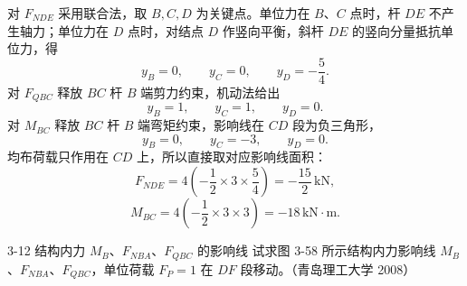 \begin{solutioncard}

对 \(F_{NDE}\) 采用联合法，取 \(B,C,D\) 为关键点。单位力在 \(B\)、\(C\) 点时，杆 \(DE\) 不产生轴力；单位力在 \(D\) 点时，对结点 \(D\) 作竖向平衡，斜杆 \(DE\) 的竖向分量抵抗单位力，得
\[
  y_B=0,\qquad y_C=0,\qquad y_D=-\frac54.
\]
对 \(F_{QBC}\) 释放 \(BC\) 杆 \(B\) 端剪力约束，机动法给出
\[
  y_B=1,\qquad y_C=1,\qquad y_D=0.
\]
对 \(M_{BC}\) 释放 \(BC\) 杆 \(B\) 端弯矩约束，影响线在 \(CD\) 段为负三角形，
\[
  y_B=0,\qquad y_C=-3,\qquad y_D=0.
\]
均布荷载只作用在 \(CD\) 上，所以直接取对应影响线面积：
\[
  F_{NDE}=4\left(-\frac12\times 3\times\frac54\right)
  =-\frac{15}{2}\,\mathrm{kN},
\]
\[
  M_{BC}=4\left(-\frac12\times 3\times3\right)
  =-18\,\mathrm{kN\cdot m}.
\]
\begin{figure}[H]
\centering
{}
\end{figure}
\end{solutioncard}

\begin{problemcard}{3-12 结构内力 \(M_B\)、\(F_{NBA}\)、\(F_{QBC}\) 的影响线}
试求图 3-58 所示结构内力影响线 \(M_B\)、\(F_{NBA}\)、\(F_{QBC}\)，单位荷载 \(F_P=1\) 在 \(DF\) 段移动。（青岛理工大学 2008）
\end{problemcard}

